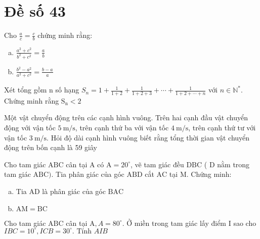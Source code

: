 \onehalfspacing
\section{Đề số 43}

\begin{bt}
	Cho $\frac{a}{c}=\frac{c}{b}$ chứng minh rằng:
	\begin{enumerate}[a.]
		\item $\frac{a^2+c^2}{b^2+c^2}=\frac{a}{b}$
		\item $\frac{b^2-a^2}{a^2+c^2}=\frac{b-a}{a}$
	\end{enumerate}
	\loigiai{} 
\end{bt}

\begin{bt}
	Xét tổng gồm $\mathrm{n}$ số hạng $S_n=1+\frac{1}{1+2}+\frac{1}{1+2+3}+\cdots+\frac{1}{1+2+\cdots+n}$ với $n \in \mathbb{N}^*$. Chứng minh rằng $\mathrm{S}_{\mathrm{n}}<2$
	\loigiai{} 
\end{bt}

\begin{bt}
	Một vật chuyển động trên các cạnh hình vuông. Trên hai cạnh đầu vật chuyển động với vận tốc $5 \mathrm{~m} / \mathrm{s}$, trên cạnh thứ ba với vận tốc $4 \mathrm{~m} / \mathrm{s}$, trên cạnh thứ tư với vận tốc $3 \mathrm{~m} / \mathrm{s}$. Hỏi độ dài cạnh hình vuông biết rằng tổng thời gian vật chuyển động trên bốn cạnh là 59 giây
	\loigiai{} 
\end{bt}

\begin{bt}
	Cho tam giác $\mathrm{ABC}$ cân tại $\mathrm{A}$ có $\mathrm{A}=20^{\circ}$, vẽ tam giác đều $\mathrm{DBC}$ ( $\mathrm{D}$ nằm trong tam giác $\mathrm{ABC})$. Tia phân giác của góc $\mathrm{ABD}$ cắt $\mathrm{AC}$ tại $\mathrm{M}$. Chứng minh:
	\begin{enumerate}[a.]
		\item Tia $\mathrm{AD}$ là phân giác của góc $\mathrm{BAC}$
		\item $\mathrm{AM}=\mathrm{BC}$
	\end{enumerate}
	\loigiai{}
\end{bt}

\begin{bt}
	Cho tam giác $\mathrm{ABC}$ cân tại $\mathrm{A}, A=80^{\circ}$. Ở miền trong tam giác lấy điểm I sao cho
	$I B C=10^{\circ}, I C B=30^{\circ} \text {. Tính } A I B$
	\loigiai{}
\end{bt}
